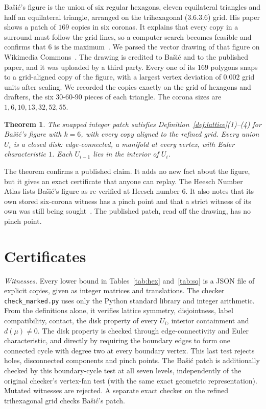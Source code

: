 \documentclass[11pt]{amsart}
\newtheorem{theorem}{Theorem}[section]
\theoremstyle{definition}
\theoremstyle{remark}
\begin{document}
Ba\v{s}i\'c's figure is the union of six regular hexagons, eleven equilateral triangles and half an equilateral triangle, arranged on the trihexagonal ($3.6.3.6$) grid. His paper shows a patch of $169$ copies in six coronas. It explains that every copy in a surround must follow the grid lines, so a computer search becomes feasible and confirms that $6$ is the maximum~\cite{Basic2021}. We parsed the vector drawing of that figure on Wikimedia Commons~\cite{BasicSVG}. The drawing is credited to Ba\v{s}i\'c and to the published paper, and it was uploaded by a third party. Every one of its $169$ polygons snaps to a grid-aligned copy of the figure, with a largest vertex deviation of $0.002$ grid units after scaling. We recorded the copies exactly on the grid of hexagons and drafters, the six $30$-$60$-$90$ pieces of each triangle. The corona sizes are $1,6,10,13,32,52,55$.

\begin{theorem}\label{thm:basic}
The snapped integer patch satisfies Definition~\ref{def:lattice}(1)--(4) for Ba\v{s}i\'c's figure with $k=6$, with every copy aligned to the refined grid. Every union $U_i$ is a closed disk: edge-connected, a manifold at every vertex, with Euler characteristic $1$. Each $U_{i-1}$ lies in the interior of $U_i$.
\end{theorem}

The theorem confirms a published claim. It adds no new fact about the figure, but it gives an exact certificate that anyone can replay. The Heesch Number Atlas lists Ba\v{s}i\'c's figure as re-verified at Heesch number $6$. It also notes that its own stored six-corona witness has a pinch point and that a strict witness of its own was still being sought~\cite{BakkerAtlas}. The published patch, read off the drawing, has no pinch point.

\section{Certificates}\label{sec:cert}

\emph{Witnesses.} Every lower bound in Tables~\ref{tab:hex} and~\ref{tab:sq} is a JSON file of explicit copies, given as integer matrices and translations. The checker \texttt{check\_marked.py} uses only the Python standard library and integer arithmetic. From the definitions alone, it verifies lattice symmetry, disjointness, label compatibility, contact, the disk property of every $U_i$, interior containment and $d(\mu)\neq0$. The disk property is checked through edge-connectivity and Euler characteristic, and directly by requiring the boundary edges to form one connected cycle with degree two at every boundary vertex. This last test rejects holes, disconnected components and pinch points. The Ba\v{s}i\'c patch is additionally checked by this boundary-cycle test at all seven levels, independently of the original checker's vertex-fan test (with the same exact geometric representation). Mutated witnesses are rejected. A separate exact checker on the refined trihexagonal grid checks Ba\v{s}i\'c's patch.
\end{document}
